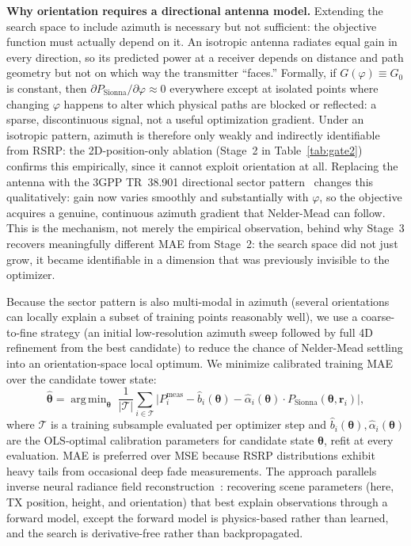 \documentclass[conference]{IEEEtran}
\DeclareMathOperator*{\argmin}{arg\,min}
\begin{document}
\textbf{Why orientation requires a directional antenna model.}
Extending the search space to include azimuth is necessary but not
sufficient: the objective function must actually depend on it.
An isotropic antenna radiates equal gain in every direction, so its
predicted power at a receiver depends on distance and path geometry
but not on which way the transmitter ``faces.''
Formally, if $G(\varphi) \equiv G_0$ is constant, then
$\partial P_\text{Sionna}/\partial\varphi \approx 0$ everywhere except at
isolated points where changing $\varphi$ happens to alter which physical
paths are blocked or reflected: a sparse, discontinuous signal, not a
useful optimization gradient.
Under an isotropic pattern, azimuth is therefore only weakly and
indirectly identifiable from RSRP: the 2D-position-only ablation
(Stage~2 in Table~\ref{tab:gate2}) confirms this empirically, since it
cannot exploit orientation at all.
Replacing the antenna with the 3GPP TR~38.901 directional sector
pattern~\cite{3gpp38901} changes this qualitatively: gain now varies
smoothly and substantially with $\varphi$, so the objective acquires a
genuine, continuous azimuth gradient that Nelder-Mead can follow.
This is the mechanism, not merely the empirical observation, behind why
Stage~3 recovers meaningfully different MAE from Stage~2: the search
space did not just grow, it became identifiable in a dimension that was
previously invisible to the optimizer.

Because the sector pattern is also multi-modal in azimuth (several
orientations can locally explain a subset of training points reasonably
well), we use a coarse-to-fine strategy (an initial low-resolution
azimuth sweep followed by full 4D refinement from the best candidate)
to reduce the chance of Nelder-Mead settling into an orientation-space
local optimum.
We minimize calibrated training MAE over the candidate tower state:
\begin{equation}
  \hat{\boldsymbol{\theta}} = \argmin_{\boldsymbol{\theta}}\;
  \frac{1}{|\mathcal{T}|}\sum_{i \in \mathcal{T}}
  \bigl|P_i^\text{meas} - \hat{b}_i(\boldsymbol{\theta})
  - \hat{\alpha}_i(\boldsymbol{\theta})\cdot
  P_\text{Sionna}(\boldsymbol{\theta}, \mathbf{r}_i)\bigr|,
  \label{eq:objective}
\end{equation}
where $\mathcal{T}$ is a training subsample evaluated per optimizer step
and $\hat{b}_i(\boldsymbol{\theta}), \hat{\alpha}_i(\boldsymbol{\theta})$
are the OLS-optimal calibration parameters for candidate state
$\boldsymbol{\theta}$, refit at every evaluation.
MAE is preferred over MSE because RSRP distributions exhibit heavy tails
from occasional deep fade measurements.
The approach parallels inverse neural radiance field
reconstruction~\cite{mildenhall2020nerf}: recovering scene parameters
(here, TX position, height, and orientation) that best explain
observations through a forward model, except the forward model is
physics-based rather than learned, and the search is derivative-free
rather than backpropagated.
\end{document}
